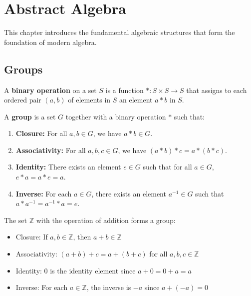 \chapter{Abstract Algebra}

This chapter introduces the fundamental algebraic structures that form the foundation of modern algebra.

\section{Groups}

\begin{definition}
A \textbf{binary operation} on a set $S$ is a function $*: S \times S \to S$ that assigns to each ordered pair $(a,b)$ of elements in $S$ an element $a * b$ in $S$.
\end{definition}

\begin{definition}[Group]
A \textbf{group} is a set $G$ together with a binary operation $*$ such that:
\begin{enumerate}
    \item \textbf{Closure:} For all $a, b \in G$, we have $a * b \in G$.
    \item \textbf{Associativity:} For all $a, b, c \in G$, we have $(a * b) * c = a * (b * c)$.
    \item \textbf{Identity:} There exists an element $e \in G$ such that for all $a \in G$, $e * a = a * e = a$.
    \item \textbf{Inverse:} For each $a \in G$, there exists an element $a^{-1} \in G$ such that $a * a^{-1} = a^{-1} * a = e$.
\end{enumerate}
\end{definition}

\begin{example}
The set $\mathbb{Z}$ with the operation of addition forms a group:
\begin{itemize}
    \item Closure: If $a, b \in \mathbb{Z}$, then $a + b \in \mathbb{Z}$
    \item Associativity: $(a + b) + c = a + (b + c)$ for all $a, b, c \in \mathbb{Z}$
    \item Identity: $0$ is the identity element since $a + 0 = 0 + a = a$
    \item Inverse: For each $a \in \mathbb{Z}$, the inverse is $-a$ since $a + (-a) = 0$
\end{itemize}
\end{example}

